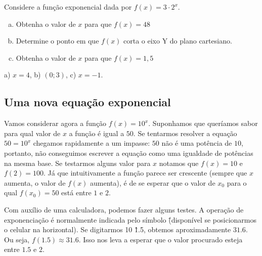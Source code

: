 \documentclass[main.tex]{subfiles}
\begin{document}
\begin{questao}
 Considere a função exponencial dada por $f(x)=3 \cdot 2^x$.
\begin{enumerate}[a)]
\item Obtenha o valor de $x$ para que $f(x)=48$
\item Determine o ponto em que $f(x)$ corta o eixo Y do plano cartesiano.
\item Obtenha o valor de $x$ para que $f(x)=1,5$
\end{enumerate}
\end{questao}


\begin{gabarito}
	\begin{gabaritoQuestao}
		a) $x=4$, b) $(0;3)$, c) $x=-1$.
	\end{gabaritoQuestao}
\end{gabarito}

\subsection*{Uma nova equação exponencial}

Vamos considerar agora a função $f(x)=10^x$. Suponhamos que queríamos sabor para qual valor de $x$ a função é igual a $50$. Se tentarmos resolver a equação $50=10^x$ chegamos rapidamente a um impasse: $50$ não é uma potência de $10$, portanto, não conseguimos escrever a equação como uma igualdade de potências na mesma base. Se testarmos alguns valor para $x$ notamos que $f(x)=10$ e $f(2)=100$. Já que intuitivamente a função parece ser crescente (sempre que $x$ aumenta, o valor de $f(x)$ aumenta), é de se esperar que o valor de $x_0$ para o qual $f(x_0)=50$ está entre $1$ e $2$.

Com auxílio de uma calculadora, podemos fazer alguns testes. A operação de exponenciação é normalmente indicada pelo símbolo \^ (disponível se posicionarmos o celular na horizontal). Se digitarmos 10 \^ 1.5, obtemos aproximadamente $31.6$. Ou seja, $f(1.5) \approx 31.6$. Isso nos leva a esperar que o valor procurado esteja entre $1.5$ e $2$.
\end{document}
